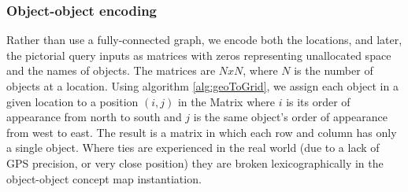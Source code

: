 \subsubsection{Object-object encoding}
Rather than use a fully-connected graph, we encode both the locations, and later, the pictorial query inputs as matrices with zeros representing unallocated space and the names of objects. 
The matrices are $NxN$, where $N$ is the number of objects at a location. 
Using algorithm \ref{alg:geoToGrid}, we assign each object in a given location to a position $(i,j)$ in the Matrix where $i$ is its order of appearance from north to south and $j$ is the same object's order of appearance from west to east. 
The result is a matrix in which each row and column has only a single object. 
Where ties are experienced in the real world (due to a lack of GPS precision, or very close position) they are broken lexicographically in the object-object concept map instantiation.



%



